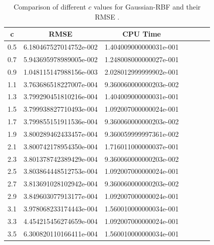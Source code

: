 \documentclass[12pt]{article}
\numberwithin{equation}{section} %
\begin{document}
\newpage
\begin{table}[h]
\centering
\begin{tabular}{|c|c|c|c|c|c|c|}
  \hline
  c &  RMSE & CPU Time \\
  \hline
  0.5 & 6.180467527014752e-002 &  1.404009000000031e-001  \\
  0.7 & 5.943695978989005e-002  &1.248008000000027e-001   \\
  0.9 &1.048115147988156e-003   & 2.028012999999902e-001   \\
  1.1 &3.763686518227007e-004   &9.360060000000203e-002 \\
  1.3 &3.799290451810216e-004  &1.404009000000031e-001 \\
  1.5 &3.799938827710493e-004   &1.092007000000024e-001  \\
  1.7 &3.799855151911536e-004   & 9.360060000000203e-002  \\
  1.9 &3.800289462433457e-004   &9.360059999997361e-002    \\
  2.1 & 3.800742178954350e-004  & 1.716011000000037e-001 \\
  2.3& 3.801378742389429e-004&9.360060000000203e-002\\
  2.5&3.803864448512753e-004&1.092007000000024e-001\\
  2.7&3.813691028102942e-004  &9.360060000000203e-002\\
  2.9&3.849603077913177e-004&1.092007000000024e-001\\
  3.1&3.978068233174443e-004 &1.560010000000034e-001\\
  3.3& 4.454215456274659e-004    &1.092007000000024e-001\\
  3.5&6.300820110166411e-004   &1.560010000000034e-001\\
  \hline

\end{tabular}
  \caption{Comparison of different $c$ values for Gaussian-RBF and their RMSE .}\label{Tab_1DFinal}
\end{table}
\end{document}
